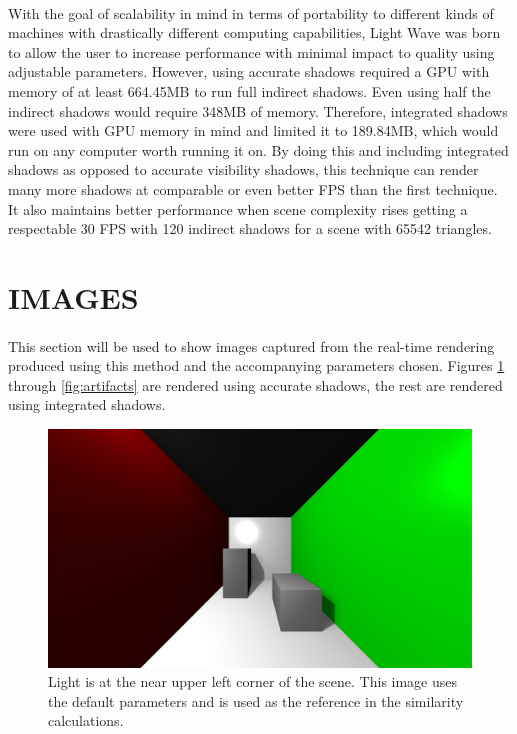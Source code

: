 \paragraph{}
With the goal of scalability in mind in terms of portability to different kinds of machines with drastically different computing capabilities, Light Wave was born to allow the user to increase performance with minimal impact to quality using adjustable parameters.  However, using accurate shadows required a GPU with memory of at least 664.45MB to run full indirect shadows. Even using half the indirect shadows would require 348MB of memory.  Therefore, integrated shadows were used with GPU memory in mind and limited it to 189.84MB, which would run on any computer worth running it on.  By doing this and including integrated shadows as opposed to accurate visibility shadows, this technique can render many more shadows at comparable or even better FPS than the first technique.  It also maintains better performance when scene complexity rises getting a respectable 30 FPS with 120 indirect shadows for a scene with 65542 triangles.

\section{IMAGES}
\paragraph{}
This section will be used to show images captured from the real-time rendering produced using this method and the accompanying parameters chosen. Figures \ref{fig:defaultimage} through \ref{fig:artifacts} are rendered using accurate shadows, the rest are rendered using integrated shadows.

\begin{figure}[h!]
  \centering
    \includegraphics[width=1.0\textwidth]{sample1.jpg}
  \caption{Light is at the near upper left corner of the scene. This image uses the default parameters and is used as the reference in the similarity calculations.}
	\label{fig:defaultimage}
\end{figure}


